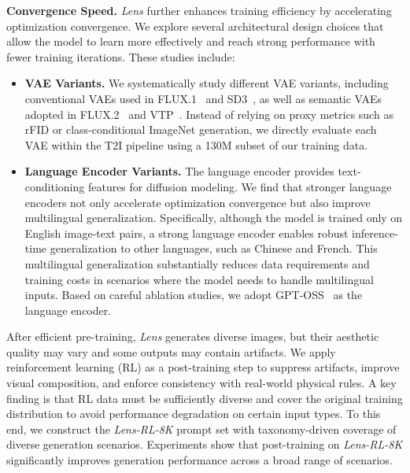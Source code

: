 \documentclass{llmxive}
\begin{document}
\noindent\textbf{Convergence Speed.} \textit{Lens} further enhances training efficiency by accelerating optimization convergence. We explore several architectural design choices that allow the model to learn more effectively and reach strong performance with fewer training iterations. These studies include:

\begin{itemize}[leftmargin=*, labelsep=0.3em]
\item \textbf{VAE Variants.} We systematically study different VAE variants, including conventional VAEs used in FLUX.1~\citep{flux2024} and SD3~\citep{esser2024scaling}, as well as semantic VAEs adopted in FLUX.2~\citep{flux-2-2025} and VTP~\citep{vtp}. Instead of relying on proxy metrics such as rFID or class-conditional ImageNet generation, we directly evaluate each VAE within the T2I pipeline using a 130M subset of our training data. 

\item \textbf{Language Encoder Variants.} The language encoder provides text-conditioning features for diffusion modeling. We find that stronger language encoders not only accelerate optimization convergence but also improve multilingual generalization. Specifically, although the model is trained only on English image-text pairs, a strong language encoder enables robust inference-time generalization to other languages, such as Chinese and French. This multilingual generalization substantially reduces data requirements and training costs in scenarios where the model needs to handle multilingual inputs. Based on careful ablation studies, we adopt GPT-OSS~\citep{openai2025gptoss120bgptoss20bmodel} as the language encoder.
\end{itemize}


After efficient pre-training, \textit{Lens} generates diverse images, but their aesthetic quality may vary and some outputs may contain artifacts. We apply reinforcement learning (RL) as a post-training step to suppress artifacts, improve visual composition, and enforce consistency with real-world physical rules. A key finding is that RL data must be sufficiently diverse and cover the original training distribution to avoid performance degradation on certain input types. To this end, we construct the \textit{Lens-RL-8K} prompt set with taxonomy-driven coverage of diverse generation scenarios. Experiments show that post-training on \textit{Lens-RL-8K} significantly improves generation performance across a broad range of scenarios.
\end{document}
